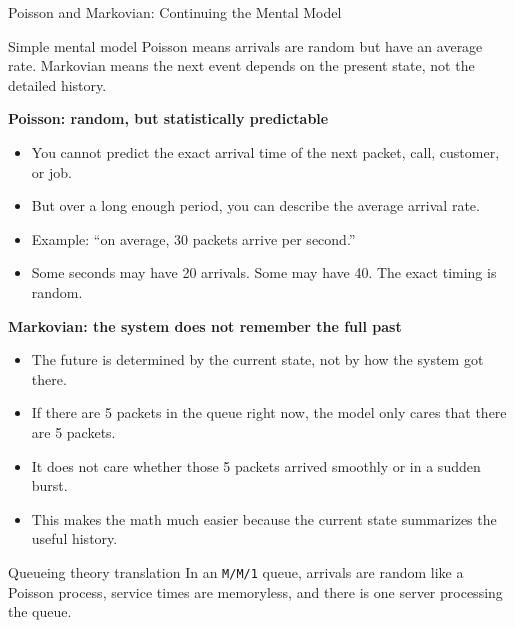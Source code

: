 \documentclass[aspectratio=169]{beamer}
\begin{document}
\begin{frame}{Poisson and Markovian: Continuing the Mental Model}
\tiny

\begin{alertblock}{Simple mental model}
Poisson means arrivals are random but have an average rate.  
Markovian means the next event depends on the present state, not the detailed history.
\end{alertblock}

\vspace{0.25cm}

\textbf{Poisson: random, but statistically predictable}

\begin{itemize}
    \item You cannot predict the exact arrival time of the next packet, call, customer, or job.
    \item But over a long enough period, you can describe the average arrival rate.
    \item Example: ``on average, 30 packets arrive per second.''
    \item Some seconds may have 20 arrivals. Some may have 40. The exact timing is random.
\end{itemize}

\vspace{0.15cm}

\textbf{Markovian: the system does not remember the full past}

\begin{itemize}
    \item The future is determined by the current state, not by how the system got there.
    \item If there are 5 packets in the queue right now, the model only cares that there are 5 packets.
    \item It does not care whether those 5 packets arrived smoothly or in a sudden burst.
    \item This makes the math much easier because the current state summarizes the useful history.
\end{itemize}

\vspace{0.2cm}

\begin{block}{Queueing theory translation}
In an \texttt{M/M/1} queue, arrivals are random like a Poisson process, service times are memoryless, and there is one server processing the queue.
\end{block}

\end{frame}
\end{document}
